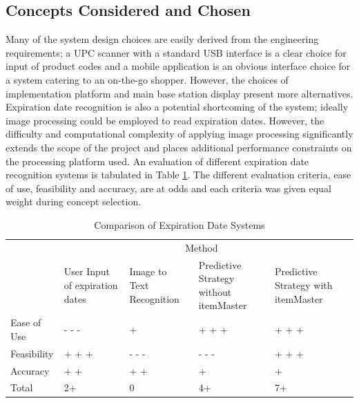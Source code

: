 \documentclass[11pt]{article} %
\begin{document}
\subsection{Concepts Considered and Chosen}
Many of the system design choices are easily derived from the engineering requirements; a UPC scanner with a standard USB interface is a clear choice for input of product codes and a mobile application is an obvious interface choice for a system catering to an on-the-go shopper. However, the choices of implementation platform and main base station display present more alternatives. Expiration date recognition is also a potential shortcoming of the system; ideally image processing could be employed to read expiration dates. However, the difficulty and computational complexity of applying image processing significantly extends the scope of the project and places additional performance constraints on the processing platform used. An evaluation of different expiration date recognition systems is tabulated in Table \ref{tab:datesys}. The different evaluation criteria, ease of use, feasibility and accuracy, are at odds and each criteria was given equal weight during concept selection.
\begin{table}[h!]
\vspace{0.5cm}
\caption{Comparison of Expiration Date Systems}
\begin{tabular}{| p{1in} | p{1.15in} | p{1.15in} | p{1.15in} | p{1.15in}  | p{1.15in} |}
\cline{2-5}
\multicolumn{1}{c}{}&\multicolumn{4}{|c|}{Method} \\
\cline{2-5}
\multicolumn{1}{c|}{}&User Input \newline of expiration \newline dates& Image to Text \newline Recognition & Predictive \newline Strategy without \newline itemMaster& Predictive \newline Strategy with \newline itemMaster \\
\hline
Ease of Use&- - -&+&+ + +&+ + +\\
\hline
Feasibility&+ + +&- - -&- - -&+ + +\\
\hline
Accuracy & + + & + + &+&+\\
\hline \hline
Total &2+ &0&4+&7+\\
\hline
\end{tabular}
\label{tab:datesys}
\end{table}
\newline \quad \newline
\end{document}
